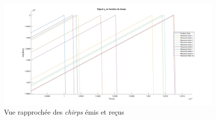 \begin{figure}[H]
  \centering
  \includegraphics[scale = 0.2]{Pictures/multiple_target_zoom.jpg}  \caption{Vue rapprochée des \textit{chirps} émis et reçus}
  \label{fig:all_chirp_zoom}
\end{figure}


